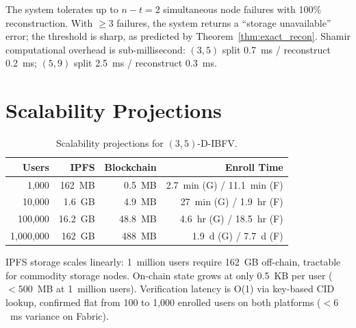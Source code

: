 The system tolerates up to $n{-}t = 2$ simultaneous node failures with 100\%
reconstruction. With $\geq 3$ failures, the system returns a ``storage unavailable''
error; the threshold is sharp, as predicted by Theorem~\ref{thm:exact_recon}.
Shamir computational overhead is sub-millisecond: $(3,5)$ split 0.7~ms / reconstruct
0.2~ms; $(5,9)$ split 2.5~ms / reconstruct 0.3~ms.

\section{Scalability Projections}
\label{sec:scalability_exp}

\begin{table}[h]
\centering
\caption{Scalability projections for $(3,5)$-D-IBFV.}
\label{tab:scalability_proj}
\small
\begin{tabular}{@{}r rrr@{}}
\toprule
\textbf{Users} & \textbf{IPFS} & \textbf{Blockchain} & \textbf{Enroll Time} \\
\midrule
1{,}000     & 162~MB   & 0.5~MB  & 2.7~min (G) / 11.1~min (F) \\
10{,}000    & 1.6~GB   & 4.9~MB  & 27~min (G) / 1.9~hr (F)    \\
100{,}000   & 16.2~GB  & 48.8~MB & 4.6~hr (G) / 18.5~hr (F)   \\
1{,}000{,}000 & 162~GB & 488~MB  & 1.9~d (G) / 7.7~d (F)      \\
\bottomrule
\end{tabular}
\end{table}

IPFS storage scales linearly: 1~million users require 162~GB off-chain, tractable
for commodity storage nodes. On-chain state grows at only 0.5~KB per user
($< 500$~MB at 1~million users). Verification latency is O(1) via key-based CID
lookup, confirmed flat from 100 to 1{,}000 enrolled users on both platforms
($< 6$~ms variance on Fabric).
